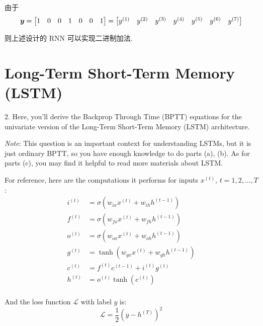 \documentclass{article}
\begin{document}
由于
\begin{equation}
  \bm{y}
  =\begin{bmatrix}
    1 & 0 & 0 & 1 & 0 & 0 & 1 \\
  \end{bmatrix}
  =\begin{bmatrix}
    y^{(1)} & y^{(2)} & y^{(3)} & y^{(4)} & y^{(5)} & y^{(6)} & y^{(7)} \\
  \end{bmatrix}
\end{equation}

则上述设计的 RNN 可以实现二进制加法.

\section*{Long-Term Short-Term Memory (LSTM)}

2. Here, you'll derive the Backprop Through Time (BPTT) equations for the univariate version of the Long-Term Short-Term Memory (LSTM) architecture.

\emph{Note}: This question is an important context for understanding LSTMs, but it is just ordinary BPTT, so you have enough knowledge to do parts (a), (b). As for parts (c), you may find it helpful to read more materials about LSTM.

For reference, here are the computations it performs for inputs $x^{(t)}$, $t=1,2,\dots,T$:
\begin{equation}
  \begin{aligned}
      i^{(t)}&=\sigma\left(w_{i x} x^{(t)}+w_{i h} h^{(t-1)}\right) \\ 
      f^{(t)}&=\sigma\left(w_{f x} x^{(t)}+w_{f h} h^{(t-1)}\right) \\ 
      o^{(t)}&=\sigma\left(w_{o x} x^{(t)}+w_{o h} h^{(t-1)}\right) \\ 
      g^{(t)}&=\tanh\left(w_{g x} x^{(t)}+w_{g h} h^{(t-1)}\right) \\ 
      c^{(t)}&=f^{(t)} c^{(t-1)}+i^{(t)}g^{(t)} \\ 
      h^{(t)}&=o^{(t)}\tanh\left(c^{(t)}\right)\\
  \end{aligned}
\end{equation}

And the loss function $\mathcal{L}$ with label $y$ is:
\begin{equation}
  \mathcal{L} = \frac{1}{2}\left(y-h^{(T)}\right)^2
\end{equation}
\end{document}
